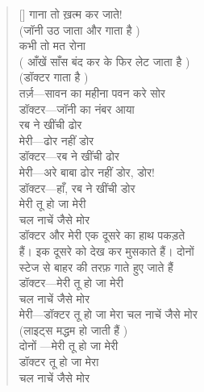 \begin{verse}[\versewidth]
{गाना तो ख़त्म कर जाते!\\
(जॉनी उठ जाता और गाता है
)\\
कभी तो मत रोना\\
( आँखें साँस बंद कर के फिर लेट जाता है
)\\
(डॉक्टर गाता है
)\\
तर्ज़—सावन का महीना पवन करे सोर\\
डॉक्टर—जॉनी का नंबर आया\\
रब ने खींची ढोर\\
मेरी—ढोर नहीं डोर\\
डॉक्टर—रब ने खींची ढोर\\
मेरी—अरे बाबा ढोर नहीं डोर, डोर!\\
डॉक्टर—हाँ, रब ने खींची डोर\\
मेरी तू हो जा मेरी\\
चल नाचें जैसे मोर\\
डॉक्टर और मेरी एक दूसरे का हाथ पकड़ते\\
हैं। इक दूसरे को देख कर मुसकाते हैं। दोनों\\
स्टेज से बाहर की तरफ़ गाते हुए जाते हैं\\
डॉक्टर—मेरी तू हो जा मेरी\\
चल नाचें जैसे मोर\\
मेरी—डॉक्टर तू हो जा मेरा चल नाचें जैसे मोर\\
(लाइट्स मद्धम हो जाती हैं
)\\
दोनों —मेरी तू हो जा मेरी\\
डॉक्टर तू हो जा मेरा\\
चल नाचें जैसे मोर
}\end{verse}


